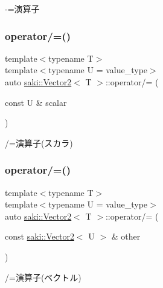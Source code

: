 -\/=演算子 

\mbox{\label{classsaki_1_1_vector2_a77f6c9bcfeb9f830edf2883069894a30}} 
\subsubsection{\texorpdfstring{operator/=()}{operator/=()}\hspace{0.1cm}{\footnotesize\ttfamily [1/2]}}
{\footnotesize\ttfamily template$<$typename T$>$ \\
template$<$typename U  = value\+\_\+type$>$ \\
auto \mbox{\hyperlink{classsaki_1_1_vector2}{saki\+::\+Vector2}}$<$ T $>$\+::operator/= (\begin{DoxyParamCaption}\item[{const U \&}]{scalar }\end{DoxyParamCaption})\hspace{0.3cm}{\ttfamily [inline]}}



/=演算子(スカラ) 

\mbox{\label{classsaki_1_1_vector2_a108831d9de33c1f71dff2d96bf75b912}} 
\subsubsection{\texorpdfstring{operator/=()}{operator/=()}\hspace{0.1cm}{\footnotesize\ttfamily [2/2]}}
{\footnotesize\ttfamily template$<$typename T$>$ \\
template$<$typename U  = value\+\_\+type$>$ \\
auto \mbox{\hyperlink{classsaki_1_1_vector2}{saki\+::\+Vector2}}$<$ T $>$\+::operator/= (\begin{DoxyParamCaption}\item[{const \mbox{\hyperlink{classsaki_1_1_vector2}{saki\+::\+Vector2}}$<$ U $>$ \&}]{other }\end{DoxyParamCaption})\hspace{0.3cm}{\ttfamily [inline]}}



/=演算子(ベクトル) 

